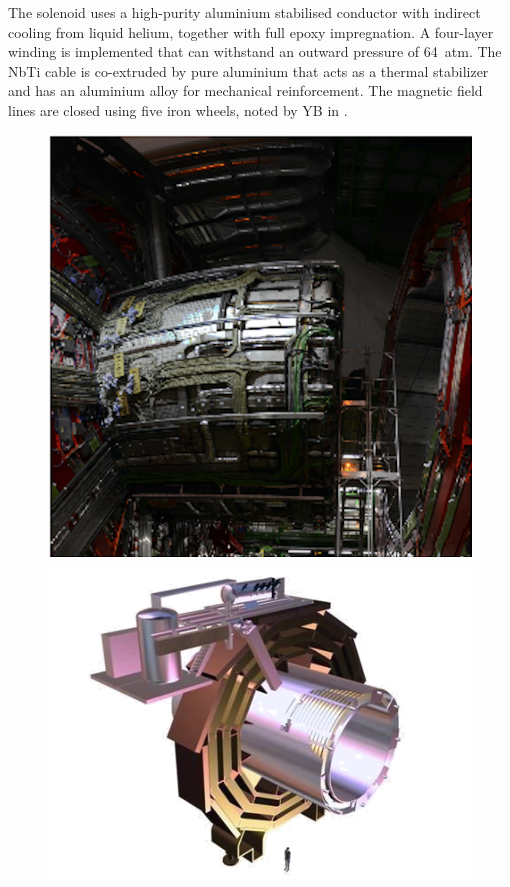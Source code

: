 	The solenoid uses a high-purity aluminium stabilised conductor with indirect cooling from liquid helium, together with full epoxy impregnation. A four-layer winding is implemented that can withstand an outward pressure of 64~atm. The NbTi cable is co-extruded by pure aluminium that acts as a thermal stabilizer and has an aluminium alloy for mechanical reinforcement. The  magnetic field lines are closed using five iron wheels, noted by YB in .
	\begin{figure}[htbp]
		\centering
		\begin{minipage}{0.6\linewidth}
		\includegraphics[width=1.\linewidth]{2_ExperimentalSetup/Figures/solenoid.png}
	\end{minipage}
		\begin{minipage}{0.39\linewidth}
		\includegraphics[width=\linewidth]{2_ExperimentalSetup/Figures/839_1a}

\end{minipage}
\end{figure}
